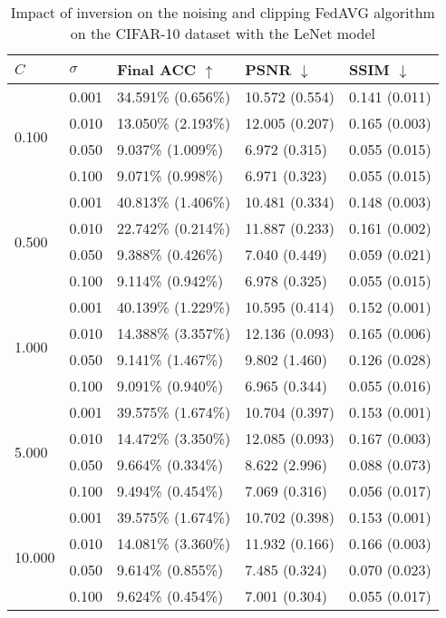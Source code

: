 \documentclass[conference,compsoc]{IEEEtran}
\begin{document}
\begin{table}[H]
\centering
\caption{Impact of inversion on the noising and clipping FedAVG algorithm on the CIFAR-10 dataset with the LeNet model}
\label{table:dp_cifar10_lenet}
\begin{tabular}{lllll}
\hline
$C$ & $\sigma$ & \textbf{Final ACC} $\uparrow$ & \textbf{PSNR} $\downarrow$ & \textbf{SSIM} $\downarrow$ \\
\hline
\multirow{4}{*}{0.100} & 0.001 & 34.591\% (0.656\%) & 10.572 (0.554) & 0.141 (0.011) \\
& 0.010 & 13.050\% (2.193\%) & 12.005 (0.207) & 0.165 (0.003) \\
& 0.050 & 9.037\% (1.009\%) & 6.972 (0.315) & 0.055 (0.015) \\
& 0.100 & 9.071\% (0.998\%) & 6.971 (0.323) & 0.055 (0.015) \\
\hline
\multirow{4}{*}{0.500} & 0.001 & 40.813\% (1.406\%) & 10.481 (0.334) & 0.148 (0.003) \\
& 0.010 & 22.742\% (0.214\%) & 11.887 (0.233) & 0.161 (0.002) \\
& 0.050 & 9.388\% (0.426\%) & 7.040 (0.449) & 0.059 (0.021) \\
& 0.100 & 9.114\% (0.942\%) & 6.978 (0.325) & 0.055 (0.015) \\
\hline
\multirow{4}{*}{1.000} & 0.001 & 40.139\% (1.229\%) & 10.595 (0.414) & 0.152 (0.001) \\
& 0.010 & 14.388\% (3.357\%) & 12.136 (0.093) & 0.165 (0.006) \\
& 0.050 & 9.141\% (1.467\%) & 9.802 (1.460) & 0.126 (0.028) \\
& 0.100 & 9.091\% (0.940\%) & 6.965 (0.344) & 0.055 (0.016) \\
\hline
\multirow{4}{*}{5.000} & 0.001 & 39.575\% (1.674\%) & 10.704 (0.397) & 0.153 (0.001) \\
& 0.010 & 14.472\% (3.350\%) & 12.085 (0.093) & 0.167 (0.003) \\
& 0.050 & 9.664\% (0.334\%) & 8.622 (2.996) & 0.088 (0.073) \\
& 0.100 & 9.494\% (0.454\%) & 7.069 (0.316) & 0.056 (0.017) \\
\hline
\multirow{4}{*}{10.000} & 0.001 & 39.575\% (1.674\%) & 10.702 (0.398) & 0.153 (0.001) \\
& 0.010 & 14.081\% (3.360\%) & 11.932 (0.166) & 0.166 (0.003) \\
& 0.050 & 9.614\% (0.855\%) & 7.485 (0.324) & 0.070 (0.023) \\
& 0.100 & 9.624\% (0.454\%) & 7.001 (0.304) & 0.055 (0.017) \\
\hline
\end{tabular}
\end{table}
\end{document}

